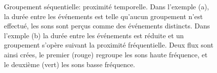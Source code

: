 \begin{figure}[bth]
        \myfloatalign
        \caption[Groupement séquentiel : proximité temporelle.]{Groupement séquentielle: proximité temporelle. Dans l'exemple (a), la durée entre les événements est telle qu'aucun groupement n'est effectué, les sons sont perçus comme des événements distincts. Dans l'exmple (b) la durée entre les événements est réduite et un groupement s'opère suivant la proximité fréquentielle. Deux flux sont ainsi crées, le premier (rouge) regroupe les sons haute fréquence, et le deuxième (vert) les sons basse fréquence.}\label{fig:tonesim}
\end{figure}

